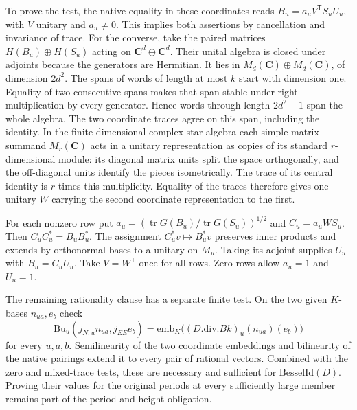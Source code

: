 To prove the test, the native equality in these coordinates reads
$B_u=a_u V^{\mathsf T}S_uU_u$, with $V$ unitary and
$a_u\ne0$. This implies both assertions by cancellation and
invariance of trace. For the converse, take the paired matrices
$H(B_u)\oplus H(S_u)$ acting on $\mathbf C^d\oplus\mathbf C^d$.
Their unital algebra is closed under adjoints because the
generators are Hermitian. It lies in $M_d(\mathbf C)\oplus M_d(\mathbf C)$,
of dimension $2d^2$. The spans of words of length at most $k$
start with dimension one. Equality of two consecutive spans makes
that span stable under right multiplication by every generator.
Hence words through length $2d^2-1$ span the whole algebra.
The two coordinate traces agree on this span, including the
identity. In the finite-dimensional complex star algebra each simple
matrix summand $M_r(\mathbf C)$ acts in a unitary representation as
copies of its standard $r$-dimensional module: its diagonal matrix
units split the space orthogonally, and the off-diagonal units
identify the pieces isometrically. The trace of its central
identity is $r$ times this multiplicity. Equality of the traces
therefore gives one unitary $W$ carrying the second coordinate
representation to the first.

For each nonzero row put
$a_u=(\operatorname{tr}G(B_u)/\operatorname{tr}G(S_u))^{1/2}$
and $C_u=a_u W S_u$. Then $C_uC_u^*=B_uB_u^*$.
The assignment $C_u^*v\mapsto B_u^*v$ preserves inner products
and extends by orthonormal bases to a unitary on $M_u$.
Taking its adjoint supplies $U_u$ with $B_u=C_u U_u$.
Take $V=W^{\mathsf T}$ once for all rows.
Zero rows allow $a_u=1$ and $U_u=1$.

The remaining rationality clause has a separate finite test. On the
two given $K$-bases $n_{ua},e_b$ check
\[
 \mathrm{Bu}_u(j_{N,u}n_{ua}, j_{EE} e_b)
   =\mathrm{emb}_{K}\bigl((D.\mathrm{div}.Bk)_u(n_{ua})(e_b)\bigr)
\]
for every $u,a,b$. Semilinearity of the two coordinate embeddings
and bilinearity of the native pairings extend it to every pair of
rational vectors. Combined with the zero and mixed-trace tests, these
are necessary and sufficient for $\mathrm{BesselId}(D)$.
Proving their values for the original periods at every sufficiently
large member remains part of the period and height obligation.
